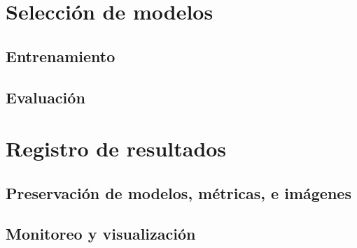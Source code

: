 \section{Selección de modelos}

\subsection{Entrenamiento}

\subsection{Evaluación}

\section{Registro de resultados}

\subsection{Preservación de modelos, métricas, e imágenes}

\subsection{Monitoreo y visualización}